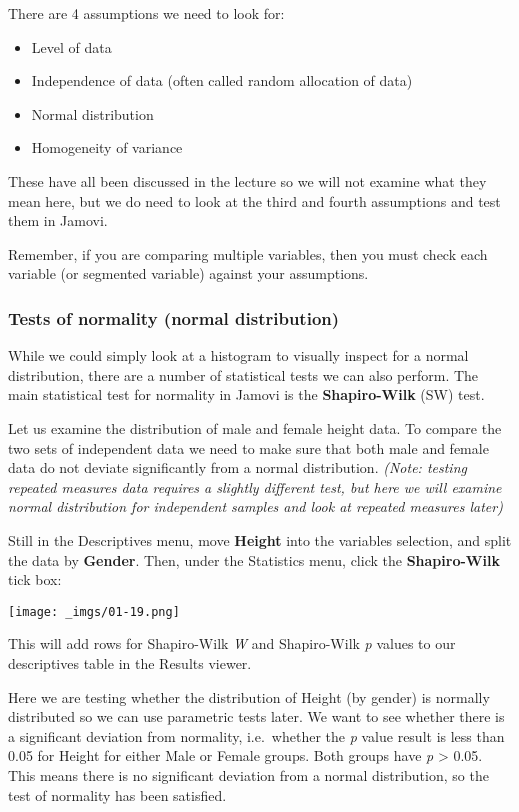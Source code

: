 \documentclass[
  letterpaper,
  DIV=11,
  numbers=noendperiod]{scrartcl}
\providecommand{\tightlist}{%
  \setlength{\itemsep}{0pt}\setlength{\parskip}{0pt}}\usepackage{longtable,booktabs,array}
\begin{document}
There are 4 assumptions we need to look for:

\begin{itemize}
\tightlist
\item
  Level of data
\item
  Independence of data (often called random allocation of data)
\item
  Normal distribution
\item
  Homogeneity of variance
\end{itemize}

These have all been discussed in the lecture so we will not examine what
they mean here, but we do need to look at the third and fourth
assumptions and test them in Jamovi.

Remember, if you are comparing multiple variables, then you must check
each variable (or segmented variable) against your assumptions.

\hypertarget{tests-of-normality-normal-distribution}{%
\subsubsection{Tests of normality (normal
distribution)}\label{tests-of-normality-normal-distribution}}

While we could simply look at a histogram to visually inspect for a
normal distribution, there are a number of statistical tests we can also
perform. The main statistical test for normality in Jamovi is the
\textbf{Shapiro-Wilk} (SW) test.

Let us examine the distribution of male and female height data. To
compare the two sets of independent data we need to make sure that both
male and female data do not deviate significantly from a normal
distribution. \emph{(Note: testing repeated measures data requires a
slightly different test, but here we will examine normal distribution
for independent samples and look at repeated measures later)}

Still in the Descriptives menu, move \textbf{Height} into the variables
selection, and split the data by \textbf{Gender}. Then, under the
Statistics menu, click the \textbf{Shapiro-Wilk} tick box:

\texttt{[image: \_imgs/01-19.png]}

This will add rows for Shapiro-Wilk \emph{W} and Shapiro-Wilk \emph{p}
values to our descriptives table in the Results viewer.

Here we are testing whether the distribution of Height (by gender) is
normally distributed so we can use parametric tests later. We want to
see whether there is a significant deviation from normality,
i.e.~whether the \emph{p} value result is less than 0.05 for Height for
either Male or Female groups. Both groups have \emph{p} \textgreater{}
0.05. This means there is no significant deviation from a normal
distribution, so the test of normality has been satisfied.
\end{document}
